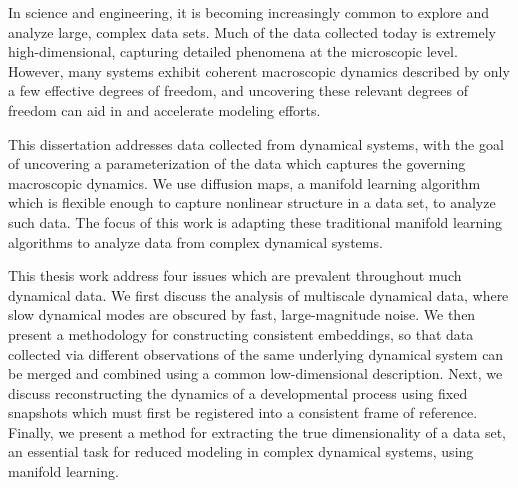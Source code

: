 

In science and engineering, it is becoming increasingly common to explore and analyze large, complex data sets. 
%
Much of the data collected today is extremely high-dimensional, capturing detailed phenomena at the microscopic level. 
%
However, many systems exhibit coherent macroscopic dynamics described by only a few effective degrees of freedom, and uncovering these relevant degrees of freedom can aid in and accelerate modeling efforts. 

This dissertation addresses data collected from dynamical systems, with the goal of uncovering a parameterization of the data which captures the governing macroscopic dynamics.
%
We use diffusion maps, a manifold learning algorithm which is flexible enough to capture nonlinear structure in a data set, to analyze such data. 
%
The focus of this work is adapting these traditional manifold learning algorithms to analyze data from complex dynamical systems. 

This thesis work address four issues which are prevalent throughout much dynamical data. 
%
We first discuss the analysis of multiscale dynamical data, where slow dynamical modes are obscured by fast, large-magnitude noise. 
%
We then present a methodology for constructing consistent embeddings, so that data collected via different observations of the same underlying dynamical system can be merged and combined using a common low-dimensional description. 
%
Next, we discuss reconstructing the dynamics of a developmental process using fixed snapshots which must first be registered into a consistent frame of reference. 
%
Finally, we present a method for extracting the true dimensionality of a data set, an essential task for reduced modeling in complex dynamical systems, using manifold learning. 